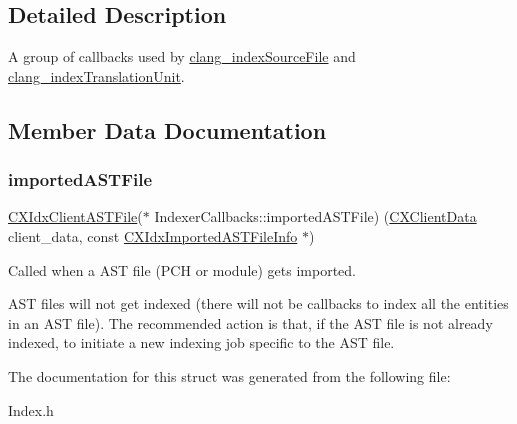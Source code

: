 \subsection{Detailed Description}
A group of callbacks used by \mbox{\hyperlink{group__CINDEX__HIGH_gaa5c2ad8979779c401b91110d444e2be6}{clang\+\_\+index\+Source\+File}} and \mbox{\hyperlink{group__CINDEX__HIGH_gab12a0795c7d7be6e7ec85679faf3f8e9}{clang\+\_\+index\+Translation\+Unit}}. 

\subsection{Member Data Documentation}
\mbox{\label{structIndexerCallbacks_a75672a9934f69854080bee3fbc0e3994}} 
\subsubsection{\texorpdfstring{imported\+A\+S\+T\+File}{importedASTFile}}
{\footnotesize\ttfamily \mbox{\hyperlink{group__CINDEX__HIGH_ga802a69b3db636a25c5d434585fce9cbd}{C\+X\+Idx\+Client\+A\+S\+T\+File}}($\ast$ Indexer\+Callbacks\+::imported\+A\+S\+T\+File) (\mbox{\hyperlink{group__CINDEX_gacfa40c3de26d228c0d898403c2c21612}{C\+X\+Client\+Data}} client\+\_\+data, const \mbox{\hyperlink{structCXIdxImportedASTFileInfo}{C\+X\+Idx\+Imported\+A\+S\+T\+File\+Info}} $\ast$)}



Called when a A\+ST file (P\+CH or module) gets imported. 

A\+ST files will not get indexed (there will not be callbacks to index all the entities in an A\+ST file). The recommended action is that, if the A\+ST file is not already indexed, to initiate a new indexing job specific to the A\+ST file. 

The documentation for this struct was generated from the following file\+:\begin{DoxyCompactItemize}
\item 
Index.\+h\end{DoxyCompactItemize}
